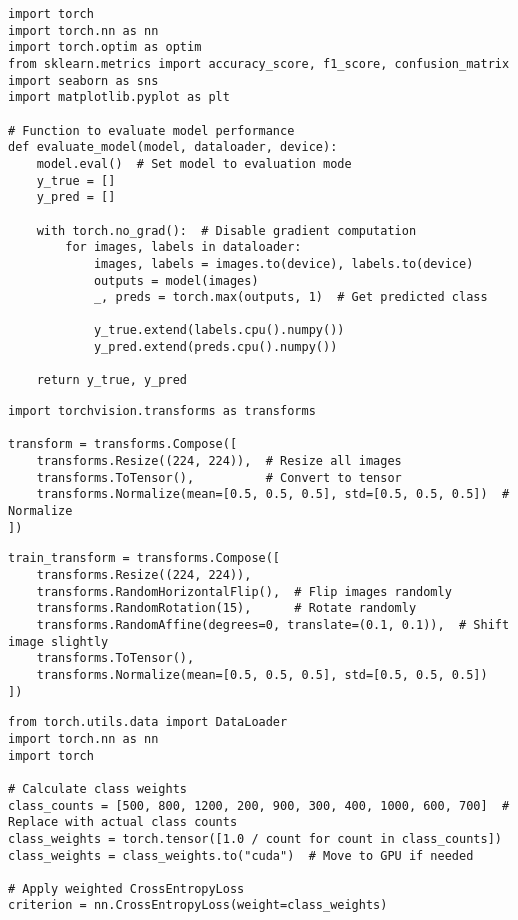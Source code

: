 \begin{verbatim}
import torch
import torch.nn as nn
import torch.optim as optim
from sklearn.metrics import accuracy_score, f1_score, confusion_matrix
import seaborn as sns
import matplotlib.pyplot as plt

# Function to evaluate model performance
def evaluate_model(model, dataloader, device):
    model.eval()  # Set model to evaluation mode
    y_true = []
    y_pred = []

    with torch.no_grad():  # Disable gradient computation
        for images, labels in dataloader:
            images, labels = images.to(device), labels.to(device)
            outputs = model(images)
            _, preds = torch.max(outputs, 1)  # Get predicted class

            y_true.extend(labels.cpu().numpy())
            y_pred.extend(preds.cpu().numpy())

    return y_true, y_pred

\end{verbatim}

\begin{verbatim}
import torchvision.transforms as transforms

transform = transforms.Compose([
    transforms.Resize((224, 224)),  # Resize all images
    transforms.ToTensor(),          # Convert to tensor
    transforms.Normalize(mean=[0.5, 0.5, 0.5], std=[0.5, 0.5, 0.5])  # Normalize
])

\end{verbatim}

\begin{verbatim}
train_transform = transforms.Compose([
    transforms.Resize((224, 224)),
    transforms.RandomHorizontalFlip(),  # Flip images randomly
    transforms.RandomRotation(15),      # Rotate randomly
    transforms.RandomAffine(degrees=0, translate=(0.1, 0.1)),  # Shift image slightly
    transforms.ToTensor(),
    transforms.Normalize(mean=[0.5, 0.5, 0.5], std=[0.5, 0.5, 0.5])
])

\end{verbatim}

\begin{verbatim}
from torch.utils.data import DataLoader
import torch.nn as nn
import torch

# Calculate class weights
class_counts = [500, 800, 1200, 200, 900, 300, 400, 1000, 600, 700]  # Replace with actual class counts
class_weights = torch.tensor([1.0 / count for count in class_counts])
class_weights = class_weights.to("cuda")  # Move to GPU if needed

# Apply weighted CrossEntropyLoss
criterion = nn.CrossEntropyLoss(weight=class_weights)

\end{verbatim}

